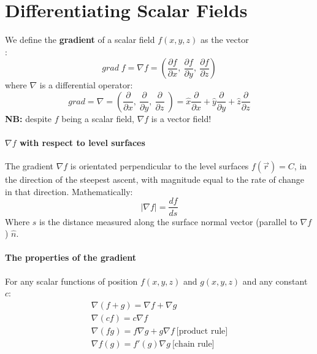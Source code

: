 \documentclass[11pt]{article}
\begin{document}
    \section{Differentiating Scalar Fields}\label{sec:differentiating-scalar-fields}
    We define the \textbf{gradient} of a scalar field $f(x,y,z)$ as the vector\\:
    \begin{equation}
        \label{eq:equation}
        grad \; f = \nabla f = (\frac{ \partial f}{\partial x},\: \frac{ \partial f}{\partial y},\: \frac{ \partial f}{\partial z})\label{eq:equation26}
    \end{equation}
    where $\nabla$ is a differential operator:
    \begin{equation}
        grad  = \nabla  = (\frac{ \partial }{\partial x},\: \frac{ \partial }{\partial y},\: \frac{ \partial }{\partial z}\;)
        = \hat{x} \frac{\partial}{\partial x} + \hat{y} \frac{\partial}{\partial y} + \hat{z} \frac{\partial}{\partial z}
        \label{eq:equation2}
    \end{equation}
    \textbf{NB:} despite $f$ being a scalar field, $\nabla f$ is a vector field!
    \\
    \paragraph{$\nabla f$ with respect to level surfaces}
    The gradient $\nabla f$ is orientated perpendicular to the level surfaces $f(\vec{r}) = C$, in the direction of the steepest ascent,
    with magnitude equal to the rate of change in that direction.
    Mathematically:
    \begin{equation}
        \label{eq:equation3}
        | \nabla f | = \frac{df}{ds}
    \end{equation}
    Where $s$ is the distance measured along the surface normal vector (parallel to $\nabla f$) $\hat{n}$.

    \paragraph{The properties of the gradient} For any scalar functions of position $f(x,y,z)$ and $g(x,y,z)$ and any constant
    $c$:
    \begin{subequations}
        \begin{align}
            \nabla (f + g) = \nabla f + \nabla g\\
            \nabla (cf) = c \nabla f\\
            \nabla (fg) = f \nabla g + g \nabla f \: \text{[product rule]}\\
            \nabla f(g) = f'(g) \nabla g  \: \text{[chain rule]}\\
        \end{align}
    \end{subequations}
\end{document}
